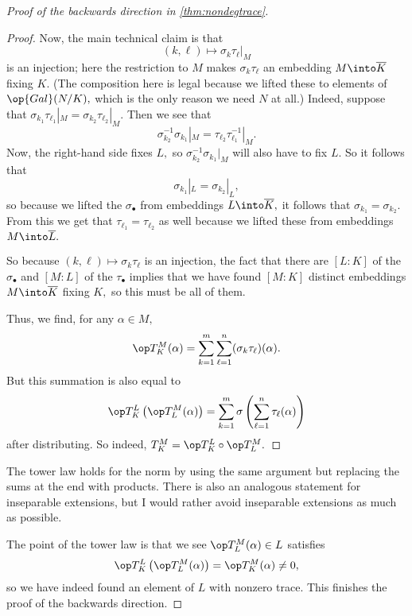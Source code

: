 \documentclass[../notes.tex]{subfiles}
\begin{document}
\begin{proof}[Proof of the backwards direction in \autoref{thm:nondegtrace}]
\begin{proof}
		Now, the main technical claim is that
		\[(k,\ell)\mapsto\sigma_k\tau_\ell|_M\]
		is an injection; here the restriction to $M$ makes $\sigma_k\tau_\ell$ an embedding $M\into\overline K$ fixing $K.$ (The composition here is legal because we lifted these to elements of $\op{Gal}(N/K),$ which is the only reason we need $N$ at all.) Indeed, suppose that $\sigma_{k_1}\tau_{\ell_1}|_M=\sigma_{k_2}\tau_{\ell_2}|_M.$ Then we see that
		\[\sigma_{k_2}^{-1}\sigma_{k_1}|
		_M=\tau_{\ell_2}\tau_{\ell_1}^{-1}|_M.\]
		Now, the right-hand side fixes $L,$ so $\sigma_{k_2}^{-1}\sigma_{k_1}|_M$ will also have to fix $L.$ So it follows that
		\[\sigma_{k_1}|_L=\sigma_{k_2}|_L,\]
		so because we lifted the $\sigma_\bullet$ from embeddings $L\into\overline K,$ it follows that $\sigma_{k_1}=\sigma_{k_2}.$ From this we get that $\tau_{\ell_1}=\tau_{\ell_2}$ as well because we lifted these from embeddings $M\into\overline L.$

		So because $(k,\ell)\mapsto\sigma_k\tau_\ell$ is an injection, the fact that there are $[L:K]$ of the $\sigma_\bullet$ and $[M:L]$ of the $\tau_\bullet$ implies that we have found $[M:K]$ distinct embeddings $M\into\overline K$ fixing $K,$ so this must be all of them.
		
		Thus, we find, for any $\alpha\in M,$
		\[\op T^M_K(\alpha)=\sum_{k=1}^m\sum_{\ell=1}^n(\sigma_k\tau_\ell)(\alpha).\]
		But this summation is also equal to
		\[\op T^L_K\left(\op T^M_L(\alpha)\right)=\sum_{k=1}^m\sigma\left(\sum_{\ell=1}^n\tau_\ell(\alpha)\right)\]
		after distributing. So indeed, $T^M_K=\op T^L_K\circ\op T^M_L.$
	\end{proof}
	\begin{remark}[Nir]
		The tower law holds for the norm by using the same argument but replacing the sums at the end with products. There is also an analogous statement for inseparable extensions, but I would rather avoid inseparable extensions as much as possible.
	\end{remark}
	The point of the tower law is that we see $\op T^M_L(\alpha)\in L$ satisfies
	\[\op T^L_K\left(\op T^M_L(\alpha)\right)=\op T^M_K(\alpha)\ne0,\]
	so we have indeed found an element of $L$ with nonzero trace. This finishes the proof of the backwards direction.
\end{proof}
\end{document}
